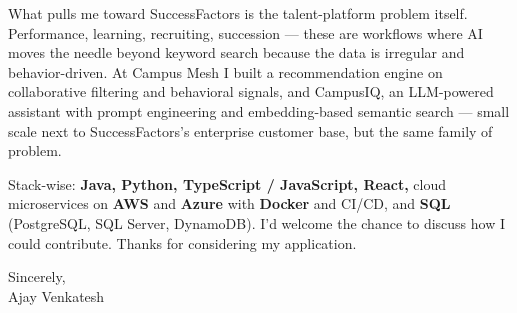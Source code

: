 \documentclass[letterpaper,11pt]{article}
\begin{document}
What pulls me toward SuccessFactors is the talent-platform problem itself. Performance, learning, recruiting, succession --- these are workflows where AI moves the needle beyond keyword search because the data is irregular and behavior-driven. At Campus Mesh I built a recommendation engine on collaborative filtering and behavioral signals, and CampusIQ, an LLM-powered assistant with prompt engineering and embedding-based semantic search --- small scale next to SuccessFactors's enterprise customer base, but the same family of problem.

Stack-wise: \textbf{Java, Python, TypeScript / JavaScript, React,} cloud microservices on \textbf{AWS} and \textbf{Azure} with \textbf{Docker} and CI/CD, and \textbf{SQL} (PostgreSQL, SQL Server, DynamoDB). I'd welcome the chance to discuss how I could contribute. Thanks for considering my application.

\vspace{12pt}

Sincerely, \\
Ajay Venkatesh
\end{document}
